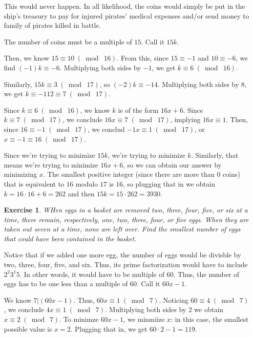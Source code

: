 \documentclass{article}
\newtheorem{ex}[thm]{Exercise}
\numberwithin{equation}{thm}
\providecommand{\gmod}[1]{\; (\bmod \; #1)}
\begin{document}
This would never happen. In all likelihood, the coins would simply be put in the ship's treasury to pay for injured pirates' medical expenses and/or send money to family of pirates killed in battle.

The number of coins must be a multiple of $15$. Call it $15k$.

Then, we know $15 \equiv 10 \gmod{16}$. From this, since $15 \equiv -1$ and $10 \equiv -6$, we find $(-1) k \equiv -6$. Multiplying both sides by $-1$, we get $k \equiv 6 \gmod{16}$.

Similarly, $15k \equiv 3 \gmod{17}$, so $(-2)k \equiv -14$. Multiplying both sides by $8$, we get $k \equiv -112 \equiv 7 \gmod{17}$.

Since $k \equiv 6 \gmod{16}$, we know $k$ is of the form $16x + 6$. Since $k \equiv 7 \gmod{17}$, we conclude $16x \equiv 7 \gmod{17}$, implying $16x \equiv 1$. Then, since $16 \equiv -1 \gmod{17}$, we conclud $-1x \equiv 1 \gmod{17}$, or $x \equiv -1 \equiv 16 \gmod{17}$.

Since we're trying to minimize $15k$, we're trying to minimize $k$. Similarly, that means we're trying to minimize $16x + 6$, so we can obtain our answer by minimizing $x$. The smallest positive integer (since there are more than $0$ coins) that is equivalent to $16$ modulo $17$ is $16$, so plugging that in we obtain $k = 16 \cdot 16 + 6 = 262$ and then $15k = 15 \cdot 262 = 3930$.



\begin{ex} \label{3.26}
  WHen eggs in a basket are removed two, three, four, five, or six at a time, there remain, respectively, one, two, three, four, or five eggs. When they are taken out seven at a time, none are left over. Find the smallest number of eggs that could have been contained in the basket.
\end{ex}

Notice that if we added one more egg, the number of eggs would be divisble by two, three, four, five, and six. Thus, its prime factorization would have to include $2^2 3^1 5$. In other words, it would have to be multiple of $60$. Thus, the number of eggs has to be one less than a multiple of $60$. Call it $60x - 1$.

We know $7 | (60x-1)$. Thus, $60x \equiv 1 \gmod 7$. Noticing $60 \equiv 4 \gmod 7$, we conclude $4x \equiv 1 \gmod 7$. Multiplying both sides by $2$ we obtain $x \equiv 2 \gmod 7$. To minimze $60x - 1$, we minmiize $x$: in this case, the smallest possible value is $x = 2$. Plugging that in, we get $60 \cdot 2 - 1 = 119$.
\end{document}
